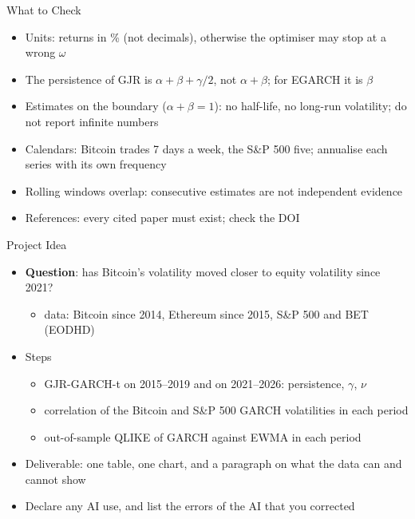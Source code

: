 \begin{frame}{What to Check}
\itemsize{\small}
\begin{itemize}
    \item Units: returns in \% (not decimals), otherwise the optimiser may stop at a wrong $\omega$
    \item The persistence of GJR is $\alpha + \beta + \gamma/2$, not $\alpha + \beta$; for EGARCH it is $\beta$
    \item Estimates on the boundary ($\alpha + \beta = 1$): no half-life, no long-run volatility; do not report infinite numbers
    \item Calendars: Bitcoin trades 7 days a week, the S\&P 500 five; annualise each series with its own frequency
    \item Rolling windows overlap: consecutive estimates are not independent evidence
    \item References: every cited paper must exist; check the DOI
\end{itemize}
\end{frame}

\begin{frame}{Project Idea}
\itemsize{\small}
\begin{itemize}
    \item \textbf{Question}: has Bitcoin's volatility moved closer to equity volatility since 2021?
    \begin{itemize}
        \item data: Bitcoin since 2014, Ethereum since 2015, S\&P 500 and BET (EODHD)
    \end{itemize}
    \item Steps
    \begin{itemize}
        \item GJR-GARCH-t on 2015--2019 and on 2021--2026: persistence, $\gamma$, $\nu$
        \item correlation of the Bitcoin and S\&P 500 GARCH volatilities in each period
        \item out-of-sample QLIKE of GARCH against EWMA in each period
    \end{itemize}
    \item Deliverable: one table, one chart, and a paragraph on what the data can and cannot show
    \item Declare any AI use, and list the errors of the AI that you corrected
\end{itemize}
\end{frame}


